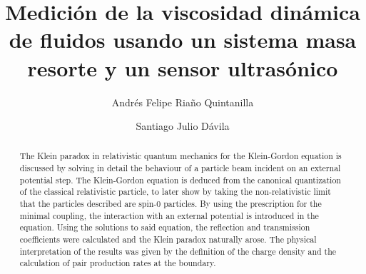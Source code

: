 \documentclass[final,5p,times,twocolumn, nopreprintline]{elsarticle}
\numberwithin{equation}{section}
\begin{document}
\begin{frontmatter}



\title{Medición de la viscosidad dinámica de fluidos usando un sistema masa resorte y un sensor ultrasónico}


\author[first]{Andrés Felipe Riaño Quintanilla}
\author[second]{Santiago Julio Dávila}

\begin{abstract}
 The Klein paradox in relativistic quantum mechanics for the Klein-Gordon equation is discussed by solving in detail the behaviour of a particle beam incident on an external potential step. The Klein-Gordon equation is deduced from the canonical quantization of the classical relativistic particle, to later show by taking the non-relativistic limit that the particles described are spin-0 particles. By using the prescription for the minimal coupling, the interaction with an external potential is introduced in the equation. Using the solutions to said equation, the reflection and transmission coefficients were calculated and the Klein paradox naturally arose. The physical interpretation of the results was given by the definition of the charge density and the calculation of pair production rates at the boundary.
\end{abstract}


\end{frontmatter}
\end{document}
